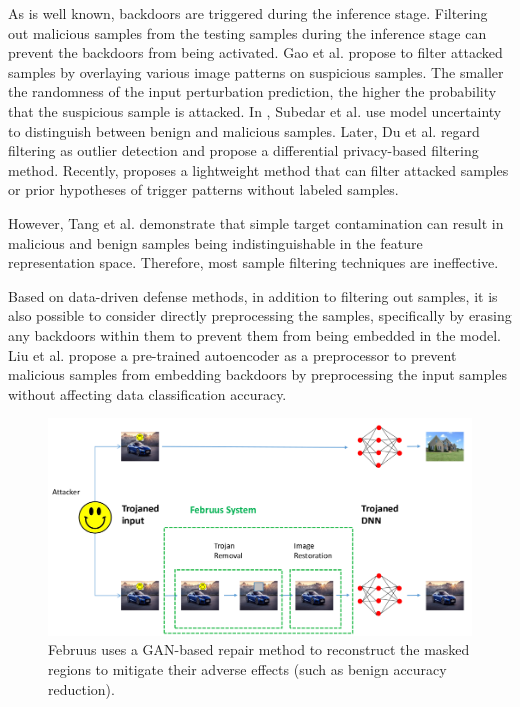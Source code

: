 \documentclass[conference]{IEEEtran}
\begin{document}
As is well known, backdoors are triggered during the inference stage.
Filtering out malicious samples from the testing samples during the inference stage can prevent the backdoors
from being activated. Gao et al. \cite{b71} propose to filter attacked samples by overlaying various image patterns
on suspicious samples. The smaller the randomness of the input perturbation prediction, the higher the probability
that the suspicious sample is attacked. In \cite{b72}, Subedar et al. use model uncertainty to distinguish between
benign and malicious samples. Later, Du et al. \cite{b73} regard filtering as outlier detection and propose a
differential privacy-based filtering method. Recently, \cite{b74} proposes a lightweight method that can filter
attacked samples or prior hypotheses of trigger patterns without labeled samples.

However, Tang et al.\cite{b70} demonstrate that
simple target contamination can result in malicious and benign samples being
indistinguishable in the feature representation space. Therefore, most
sample filtering techniques are ineffective.

Based on data-driven defense methods, in addition to filtering out samples,
it is also possible to consider directly preprocessing the samples,
specifically by erasing any backdoors within them to prevent them from being embedded in the model.
Liu et al.\cite{b75} propose a pre-trained autoencoder as a preprocessor to prevent malicious samples from embedding backdoors
by preprocessing the input samples without affecting data classification accuracy.

\begin{figure}[htbp]
    \centerline{\includegraphics[width=1.0\linewidth,height=0.5\linewidth]{picture/f9.png}}
    \caption{Februus uses a GAN-based
    repair method to reconstruct the masked regions to mitigate their 
    adverse effects (such as benign accuracy reduction).}
    \label{fig10}
\end{figure}
\end{document}
